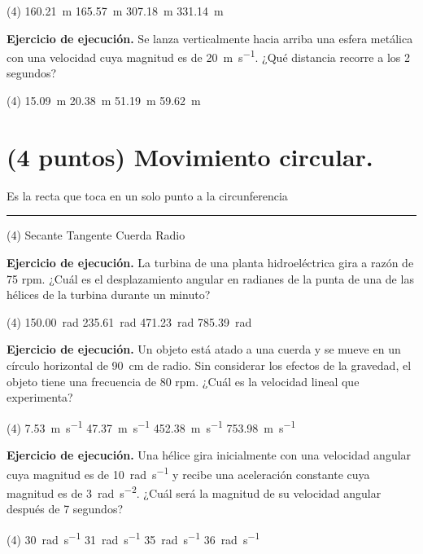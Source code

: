 \documentclass[12pt, letter]{exam}
\begin{document}
\begin{questions}
    \begin{tasks}(4)
        \task \SI{160.21}{\meter}
        \task \SI{165.57}{\meter}
        \task \SI{307.18}{\meter}
        \task \SI{331.14}{\meter}
    \end{tasks}
    \question \label{Ejercicio_06} \textbf{Ejercicio de ejecución. } Se lanza verticalmente hacia arriba una esfera metálica con una velocidad cuya magnitud es de \SI{20}{\meter\per\second}. ¿Qué distancia recorre a los \num{2} segundos?
    \begin{tasks}(4)
        \task \SI{15.09}{\meter}
        \task \SI{20.38}{\meter}
        \task \SI{51.19}{\meter}
        \task \SI{59.62}{\meter}
    \end{tasks}

    \section{(4 puntos) Movimiento circular.}

    \question Es la recta que toca en un solo punto a la circunferencia \rule{2cm}{0.1mm}
    \begin{tasks}(4)
        \task Secante
        \task Tangente
        \task Cuerda
        \task Radio
    \end{tasks}
    \question \label{Ejercicio_07} \textbf{Ejercicio de ejecución. } La turbina de una planta hidroeléctrica gira a razón de 75 rpm. ¿Cuál es el desplazamiento angular en radianes de la punta de una de las hélices de la turbina durante un minuto?
    \begin{tasks}(4)
        \task \SI{150.00}{\radian}
        \task \SI{235.61}{\radian}
        \task \SI{471.23}{\radian}
        \task \SI{785.39}{\radian}
    \end{tasks}
    \question \label{Ejercicio_08} \textbf{Ejercicio de ejecución. } Un objeto está atado a una cuerda y se mueve en un círculo horizontal de \SI{90}{\centi\meter} de radio. Sin considerar los efectos de la gravedad, el objeto tiene una frecuencia de \num{80} rpm. ¿Cuál es la velocidad lineal que experimenta?
    \begin{tasks}(4)
        \task \SI{7.53}{\meter\per\second}
        \task \SI{47.37}{\meter\per\second}
        \task \SI{452.38}{\meter\per\second}
        \task \SI{753.98}{\meter\per\second}
    \end{tasks}
    \question \label{Ejercicio_09} \textbf{Ejercicio de ejecución. } Una hélice gira inicialmente con una velocidad angular cuya magnitud es de \SI{10}{\radian\per\second} y recibe una aceleración constante cuya magnitud es de \SI{3}{\radian\per\square\second}. ¿Cuál será la magnitud de su velocidad angular después de \num{7} segundos?
    \begin{tasks}(4)
        \task \SI{30}{\radian\per\second}
        \task \SI{31}{\radian\per\second}
        \task \SI{35}{\radian\per\second}
        \task \SI{36}{\radian\per\second}
    \end{tasks}


\end{questions}
\end{document}
